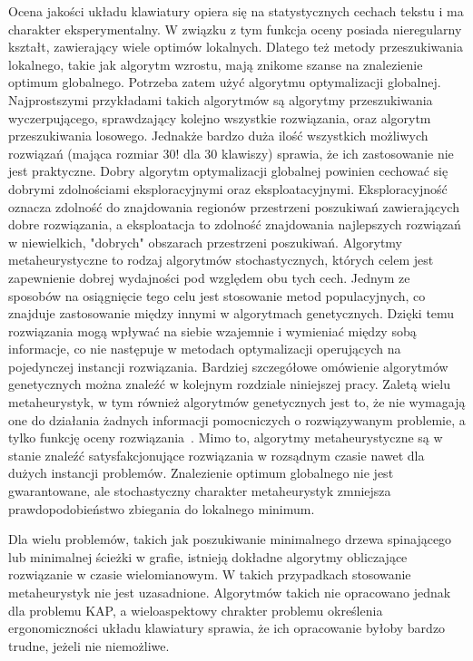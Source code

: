 \documentclass{xmgr}
\begin{document}
Ocena jakości układu klawiatury opiera się na statystycznych cechach tekstu i ma charakter eksperymentalny. W związku z tym funkcja oceny posiada nieregularny kształt, zawierający wiele optimów lokalnych. Dlatego też metody przeszukiwania lokalnego, takie jak algorytm wzrostu, mają znikome szanse na znalezienie optimum globalnego. Potrzeba zatem użyć algorytmu optymalizacji globalnej. Najprostszymi przykładami takich algorytmów są algorytmy przeszukiwania wyczerpującego, sprawdzający kolejno wszystkie rozwiązania, oraz algorytm przeszukiwania losowego. Jednakże bardzo duża ilość wszystkich możliwych rozwiązań (mająca rozmiar $30!$ dla 30 klawiszy) sprawia, że ich zastosowanie nie jest praktyczne. Dobry algorytm optymalizacji globalnej powinien cechować się dobrymi zdolnościami eksploracyjnymi oraz eksploatacyjnymi. Eksploracyjność oznacza zdolność do znajdowania regionów przestrzeni poszukiwań zawierających dobre rozwiązania, a eksploatacja to zdolność znajdowania najlepszych rozwiązań w niewielkich, "dobrych" obszarach przestrzeni poszukiwań. Algorytmy metaheurystyczne to rodzaj algorytmów stochastycznych, których celem jest zapewnienie dobrej wydajności pod względem obu tych cech. Jednym ze sposobów na osiągnięcie tego celu jest stosowanie metod populacyjnych, co znajduje zastosowanie między innymi w algorytmach genetycznych. Dzięki temu rozwiązania mogą wpływać na siebie wzajemnie i wymieniać między sobą informacje, co nie następuje w metodach optymalizacji operujących na pojedynczej instancji rozwiązania. Bardziej szczegółowe omówienie algorytmów genetycznych można znaleźć w kolejnym rozdziale niniejszej pracy. Zaletą wielu metaheurystyk, w tym również algorytmów genetycznych jest to, że nie wymagają one do działania żadnych informacji pomocniczych o rozwiązywanym problemie, a tylko funkcję oceny rozwiązania~\cite{Goldberg:1998:AGZ}. Mimo to, algorytmy metaheurystyczne są w stanie znaleźć satysfakcjonujące rozwiązania w rozsądnym czasie nawet dla dużych instancji problemów. Znalezienie optimum globalnego nie jest gwarantowane, ale stochastyczny charakter metaheurystyk zmniejsza prawdopodobieństwo zbiegania do lokalnego minimum.

Dla wielu problemów, takich jak poszukiwanie minimalnego drzewa spinającego lub minimalnej ścieżki w grafie, istnieją dokładne algorytmy obliczające rozwiązanie w czasie wielomianowym. W takich przypadkach stosowanie metaheurystyk nie jest uzasadnione. Algorytmów takich nie opracowano jednak dla problemu KAP, a wieloaspektowy chrakter problemu określenia ergonomiczności układu klawiatury sprawia, że ich opracowanie byłoby bardzo trudne, jeżeli nie niemożliwe.
\end{document}
